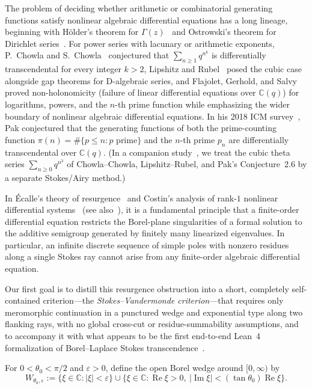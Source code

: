 \documentclass[10pt,reqno]{amsart}
\numberwithin{equation}{section}
\theoremstyle{definition}
\newcommand{\C}{\mathbb{C}}
\DeclareMathOperator{\RePart}{Re}
\DeclareMathOperator{\ImPart}{Im}
\renewcommand{\Re}{\RePart}
\renewcommand{\Im}{\ImPart}
\begin{document}
The problem of deciding whether arithmetic or combinatorial generating functions satisfy nonlinear algebraic differential equations has a long lineage, beginning with H\"older's theorem for $\Gamma(z)$~\cite{Holder1887} and Ostrowski's theorem for Dirichlet series~\cite{Ostrowski1920}. For power series with lacunary or arithmetic exponents, P.~Chowla and S.~Chowla~\cite{ChowlaChowla1984I,ChowlaChowla1984II} conjectured that $\sum_{n \ge 1} q^{n^k}$ is differentially transcendental for every integer $k > 2$, Lipshitz and Rubel~\cite{LipshitzRubel1991} posed the cubic case alongside gap theorems for D-algebraic series, and Flajolet, Gerhold, and Salvy~\cite{FlajoletGerholdSalvy2005} proved non-holonomicity (failure of linear differential equations over $\C(q)$) for logarithms, powers, and the $n$-th prime function while emphasizing the wider boundary of nonlinear algebraic differential equations. In his 2018 ICM survey~\cite[Conjecture~2.5]{Pak2018}, Pak conjectured that the generating functions of both the prime-counting function $\pi(n) = \#\{p \le n : p\text{ prime}\}$ and the $n$-th prime $p_n$ are differentially transcendental over $\C(q)$. (In a companion study~\cite{Helminen2026CubicTheta}, we treat the cubic theta series $\sum_{n \ge 0} q^{n^3}$ of Chowla--Chowla, Lipshitz--Rubel, and Pak's Conjecture~2.6 by a separate Stokes/Airy method.)

In \'Ecalle's theory of resurgence~\cite{Ecalle1981} and Costin's analysis of rank-$1$ nonlinear differential systems~\cite{Costin1998,Costin2009} (see also~\cite{Balser1994,Sauzin2016}), it is a fundamental principle that a finite-order differential equation restricts the Borel-plane singularities of a formal solution to the additive semigroup generated by finitely many linearized eigenvalues. In particular, an infinite discrete sequence of simple poles with nonzero residues along a single Stokes ray cannot arise from any finite-order algebraic differential equation.

Our first goal is to distill this resurgence obstruction into a short, completely self-contained criterion---the \emph{Stokes--Vandermonde criterion}---that requires only meromorphic continuation in a punctured wedge and exponential type along two flanking rays, with no global cross-cut or residue-summability assumptions, and to accompany it with what appears to be the first end-to-end Lean~4 formalization of Borel--Laplace Stokes transcendence~\cite{Helminen2026StokesVandermonde}.

For $0 < \theta_0 < \pi/2$ and $\varepsilon > 0$, define the open Borel wedge around $[0,\infty)$ by
\begin{equation}\label{eq:borel-wedge}
  W_{\theta_0,\varepsilon} := \{\xi \in \C : |\xi| < \varepsilon\} \cup \{\xi \in \C : \Re\xi > 0,\ |\Im\xi| < (\tan\theta_0)\Re\xi\}.
\end{equation}
\end{document}

